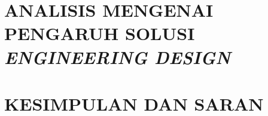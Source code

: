 \documentclass{DTETI_CP_C501}
\begin{document}
\chapter{\uppercase{Analisis Mengenai Pengaruh Solusi \textit{Engineering Design} }}
\label{chap:Impact_Engineering}


\chapter{\uppercase{Kesimpulan dan Saran}}
\label{chap:Kesimpulan_Saran}



\begin{thebibliography}{}

    

\end{thebibliography}

\newpage


\end{document}
